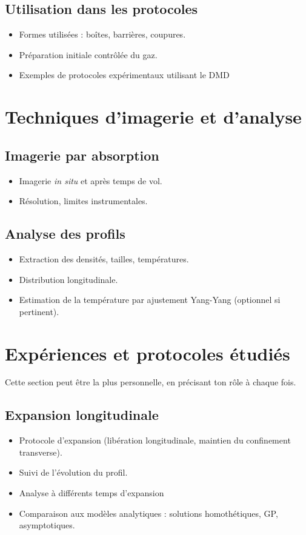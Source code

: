 \subsection{Utilisation dans les protocoles}
\begin{itemize}
    \item Formes utilisées : boîtes, barrières, coupures.
    \item Préparation initiale contrôlée du gaz.
    \item Exemples de protocoles expérimentaux utilisant le DMD
\end{itemize}

\section{Techniques d’imagerie et d’analyse}
\subsection{Imagerie par absorption}
\begin{itemize}
    \item Imagerie \textit{in situ} et après temps de vol.
    \item Résolution, limites instrumentales.
\end{itemize}

\subsection{Analyse des profils}
\begin{itemize}
    \item Extraction des densités, tailles, températures.
    \item Distribution longitudinale.
    \item Estimation de la température par ajustement Yang-Yang (optionnel si pertinent).
\end{itemize}

\section{Expériences et protocoles étudiés}
Cette section peut être la plus personnelle, en précisant ton rôle à chaque fois.
\subsection{Expansion longitudinale}
\begin{itemize}
    \item Protocole d’expansion (libération longitudinale, maintien du confinement transverse).
    \item Suivi de l’évolution du profil.
    \item Analyse à différents temps d’expansion
    \item Comparaison aux modèles analytiques : solutions homothétiques, GP, asymptotiques.
\end{itemize}

